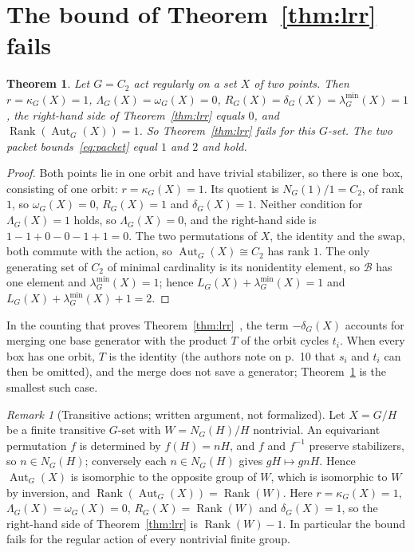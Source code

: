 \documentclass[11pt]{article}
\newtheorem{theorem}{Theorem}
\theoremstyle{remark}
\newtheorem{remark}{Remark}
\newcommand{\Rank}{\operatorname{Rank}}
\newcommand{\Aut}{\operatorname{Aut}}
\newcommand{\lmin}{\lambda^{\min}}
\begin{document}
\section{The bound of Theorem~\ref{thm:lrr} fails}\label{sec:two}

\begin{theorem}\label{thm:two}
Let $G=C_2$ act regularly on a set $X$ of two points. Then $r=\kappa_G(X)=1$,
$\Lambda_G(X)=\omega_G(X)=0$, $R_G(X)=\delta_G(X)=\lmin_G(X)=1$, the
right-hand side of Theorem~\ref{thm:lrr} equals $0$, and
$\Rank(\Aut_G(X))=1$. So Theorem~\ref{thm:lrr} fails for this $G$-set. The
two packet bounds~\eqref{eq:packet} equal $1$ and $2$ and hold.
\end{theorem}

\begin{proof}
Both points lie in one orbit and have trivial stabilizer, so there is one box,
consisting of one orbit: $r=\kappa_G(X)=1$. Its quotient is
$N_G(1)/1=C_2$, of rank $1$, so $\omega_G(X)=0$, $R_G(X)=1$ and
$\delta_G(X)=1$. Neither condition for $\Lambda_G(X)=1$ holds, so
$\Lambda_G(X)=0$, and the right-hand side is $1-1+0-0-1+1=0$. The two
permutations of $X$, the identity and the swap, both commute with the action,
so $\Aut_G(X)\cong C_2$ has rank $1$. The only generating set of $C_2$ of minimal
cardinality is its nonidentity element, so $\mathcal B$ has one element and
$\lmin_G(X)=1$; hence $L_G(X)+\lmin_G(X)=1$ and $L_G(X)+\lmin_G(X)+1=2$.
\end{proof}

In the counting that proves Theorem~\ref{thm:lrr}~\cite[p.~16]{lrr}, the term
$-\delta_G(X)$ accounts for merging one base generator with the product $T$ of
the orbit cycles $t_i$. When every box has one orbit, $T$ is the identity
(the authors note on p.~10 that $s_i$ and $t_i$ can then be omitted), and the merge
does not save a generator; Theorem~\ref{thm:two} is the smallest such case.

\begin{remark}[Transitive actions; written argument, not formalized]
\label{rem:transitive}
Let $X=G/H$ be a finite transitive $G$-set with $W=N_G(H)/H$ nontrivial. An
equivariant permutation $f$ is determined by $f(H)=nH$, and $f$ and $f^{-1}$
preserve stabilizers, so $n\in N_G(H)$; conversely each $n\in N_G(H)$ gives
$gH\mapsto gnH$. Hence $\Aut_G(X)$ is isomorphic to the opposite group of $W$,
which is isomorphic to $W$ by inversion, and $\Rank(\Aut_G(X))=\Rank(W)$. Here
$r=\kappa_G(X)=1$, $\Lambda_G(X)=\omega_G(X)=0$, $R_G(X)=\Rank(W)$ and
$\delta_G(X)=1$, so the right-hand side of Theorem~\ref{thm:lrr} is
$\Rank(W)-1$. In particular the bound fails for the regular action of every
nontrivial finite group.
\end{remark}
\end{document}
